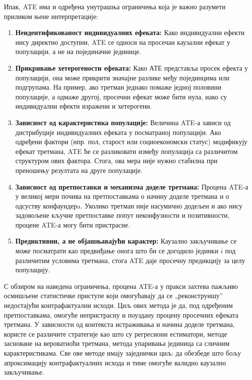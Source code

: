 \documentclass[12pt, a4paper]{article}
\begin{document}
Ипак, ATE има и одређена унутрашња ограничења која је важно разумети приликом њене интерпретације:
\begin{enumerate}
    \item \textbf{Неидентификованост индивидуалних ефеката:}
Како индивидуални ефекти нису директно доступни, ATE се односи на просечан каузални ефекат у популацији, а не на појединачне јединице.
    \item \textbf{Прикривање хетерогености ефеката:}
Како АТЕ представља просек ефекта у популацији, она може прикрити значајне разлике међу појединцима или подгрупама. На пример, ако третман једнако помаже 
једној половини популације, а одмаже другој, просечни ефекат може бити нула, иако су индивидуални ефекти изражени и хетерогени.
    \item \textbf{Зависност од карактеристика популације:}  
Величина ATE-а зависи од дистрибуције индивидуалних ефеката у посматраној популацији. Ако одређени фактори (нпр. пол, старост или социоекономски статус) модификују 
ефекат третмана, ATE ће се разликовати између популација са различитом структуром ових фактора. Стога, ова мера није нужно стабилна при преношењу резултата на друге 
популације.
    \item \textbf{Зависност од претпоставки и механизма доделе третмана:}  
Процена ATE-а у великој мери почива на претпоставкама о начину доделе третмана и о одсуству конфаундерa. Уколико третман није насумично додељен и ако нису 
задовољене кључне претпоставке попут неконфузности и позитивности, процене ATE-а могу бити пристрасне.
    \item \textbf{Предиктивни, а не објашњавајући карактер:}  
Каузално закључивање се може посматрати као предвиђање онога што би се догодило јединки $i$ под различитим условима третмана, стога ATE даје просечну предикцију за 
целу популацију.
\end{enumerate}

С обзиром на наведена ограничења, процена ATE-а у пракси захтева пажљиво осмишљене статистичке приступе који омогућавају да се „реконструишу” недостајући 
контрафактуални исходи. Циљ ових метода је да, под одређеним претпоставкама, омогуће непристрасну и 
поуздану процену просечних ефеката третмана. У зависности од контекста истраживања и начина доделе третмана, користе се различите стратегије као што су 
регресиони естиматори, методе засноване на вероватноћи третмана, метода упаривања јединица са сличним карактеристикама. Све ове методе имају 
заједнички циљ: да обезбеде што бољу апроксимацију контрафактуалних исхода и тиме омогуће валидно каузално закључивање.
\end{document}
